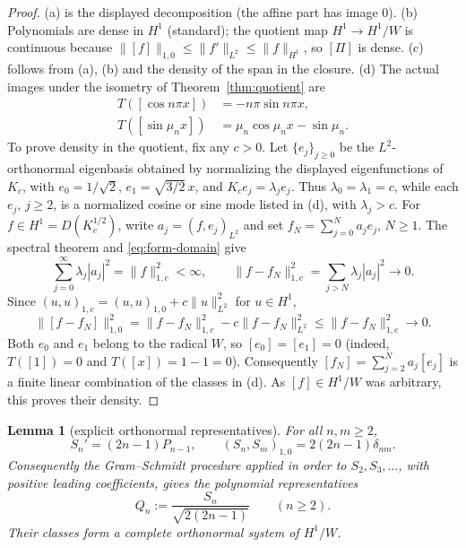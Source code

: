 ﻿\documentclass[11pt]{article}
\newtheorem{lemma}[theorem]{Lemma}
\begin{document}
\begin{proof}
	(a) is the displayed decomposition (the affine part has image $0$).
	(b) Polynomials are dense in $H^1$ (standard); the quotient map
	$H^1\to H^1/W$ is continuous because
	$\|[f]\|_{1,0}\le\|f'\|_{L^2}\le\|f\|_{H^1}$, so $[\Pi]$ is dense.
	(c) follows from (a), (b) and the density of the span in the closure.
	(d) The actual images under the isometry of
	Theorem~\ref{thm:quotient} are
	\begin{equation*}
		\begin{aligned}
			T([\cos n\pi x])&=-n\pi\sin n\pi x,\\
			T([\sin\mu_n x])&=\mu_n\cos\mu_n x-\sin\mu_n.
		\end{aligned}
	\end{equation*}
	To prove density in the quotient, fix any $c>0$.  Let
	$\{e_j\}_{j\ge0}$ be the $L^2$-orthonormal eigenbasis obtained by
	normalizing the displayed eigenfunctions of $K_c$, with
	$e_0=1/\sqrt2$, $e_1=\sqrt{3/2}\,x$, and
	$K_ce_j=\lambda_je_j$.  Thus $\lambda_0=\lambda_1=c$, while each
	$e_j$, $j\ge2$, is a normalized cosine or sine mode listed in (d), with
	$\lambda_j>c$.  For $f\in H^1=D(K_c^{1/2})$, write
	$a_j=(f,e_j)_{L^2}$ and set $f_N=\sum_{j=0}^N a_je_j$, $N\ge1$.
	The spectral theorem and \eqref{eq:form-domain} give
	\begin{equation*}
		\sum_{j=0}^{\infty}\lambda_j|a_j|^2=\|f\|_{1,c}^2<\infty,
		\qquad
		\|f-f_N\|_{1,c}^2=\sum_{j>N}\lambda_j|a_j|^2\longrightarrow0.
	\end{equation*}
	Since $(u,u)_{1,c}=(u,u)_{1,0}+c\|u\|_{L^2}^2$ for $u\in H^1$,
	\begin{equation*}
		\|[f-f_N]\|_{1,0}^2
		=\|f-f_N\|_{1,c}^2-c\|f-f_N\|_{L^2}^2
		\le\|f-f_N\|_{1,c}^2\longrightarrow0.
	\end{equation*}
	Both $e_0$ and $e_1$ belong to the radical $W$, so
	$[e_0]=[e_1]=0$ (indeed, $T([1])=0$ and $T([x])=1-1=0$).
	Consequently $[f_N]=\sum_{j=2}^N a_j[e_j]$ is a finite linear
	combination of the classes in (d).  As $[f]\in H^1/W$ was arbitrary,
	this proves their density.
\end{proof}

\begin{lemma}[explicit orthonormal representatives]\label{lem:explicit-q}
	For all $n,m\ge2$,
	\begin{equation}
		S_n'=(2n-1)P_{n-1},\qquad
		(S_n,S_m)_{1,0}=2(2n-1)\delta_{nm}.
		\label{eq:zero-gram}
	\end{equation}
	Consequently the Gram--Schmidt procedure applied in order to
	$S_2,S_3,\ldots$, with positive leading coefficients, gives the
	polynomial representatives
	\begin{equation}
		Q_n:=\frac{S_n}{\sqrt{2(2n-1)}}\qquad(n\ge2).
		\label{eq:explicit-q}
	\end{equation}
	Their classes form a complete orthonormal system of $H^1/W$.
\end{lemma}
\end{document}
